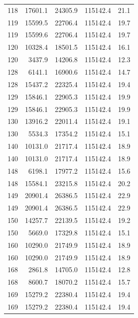 \begin{longtable}{rrrrr}
    118 & \num{17601.1} & \num{24305.9} & \num{115142.4} & 21.1 \\
    119 & \num{15599.5} & \num{22706.4} & \num{115142.4} & 19.7 \\
    119 & \num{15599.6} & \num{22706.4} & \num{115142.4} & 19.7 \\
    120 & \num{10328.4} & \num{18501.5} & \num{115142.4} & 16.1 \\
    120 & \num{3437.9} & \num{14206.8} & \num{115142.4} & 12.3 \\
    128 & \num{6141.1} & \num{16900.6} & \num{115142.4} & 14.7 \\
    128 & \num{15437.2} & \num{22325.4} & \num{115142.4} & 19.4 \\
    129 & \num{15846.1} & \num{22905.3} & \num{115142.4} & 19.9 \\
    129 & \num{15846.1} & \num{22905.3} & \num{115142.4} & 19.9 \\
    130 & \num{13916.2} & \num{22011.4} & \num{115142.4} & 19.1 \\
    130 & \num{5534.3} & \num{17354.2} & \num{115142.4} & 15.1 \\
    140 & \num{10131.0} & \num{21717.4} & \num{115142.4} & 18.9 \\
    140 & \num{10131.0} & \num{21717.4} & \num{115142.4} & 18.9 \\
    148 & \num{6198.1} & \num{17977.2} & \num{115142.4} & 15.6 \\
    148 & \num{15584.1} & \num{23215.8} & \num{115142.4} & 20.2 \\
    149 & \num{20901.4} & \num{26386.5} & \num{115142.4} & 22.9 \\
    149 & \num{20901.4} & \num{26386.5} & \num{115142.4} & 22.9 \\
    150 & \num{14257.7} & \num{22139.5} & \num{115142.4} & 19.2 \\
    150 & \num{5669.0} & \num{17329.8} & \num{115142.4} & 15.1 \\
    160 & \num{10290.0} & \num{21749.9} & \num{115142.4} & 18.9 \\
    160 & \num{10290.0} & \num{21749.9} & \num{115142.4} & 18.9 \\
    168 & \num{2861.8} & \num{14705.0} & \num{115142.4} & 12.8 \\
    168 & \num{8600.7} & \num{18070.2} & \num{115142.4} & 15.7 \\
    169 & \num{15279.2} & \num{22380.4} & \num{115142.4} & 19.4 \\
    169 & \num{15279.2} & \num{22380.4} & \num{115142.4} & 19.4 \\

\end{longtable}
